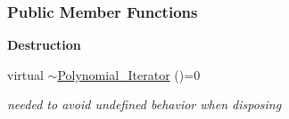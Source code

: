 \subsubsection*{Public Member Functions}
\begin{Indent}\textbf{ Destruction}\par
\begin{DoxyCompactItemize}
\item 
\mbox{\label{group___iterator_group_a20e700b363cc17d2f8c015f4eca1030f}} 
virtual \hyperlink{group___iterator_group_a20e700b363cc17d2f8c015f4eca1030f}{$\sim$\+Polynomial\+\_\+\+Iterator} ()=0
\begin{DoxyCompactList}\small\item\em needed to avoid undefined behavior when disposing \end{DoxyCompactList}\end{DoxyCompactItemize}
\end{Indent}
